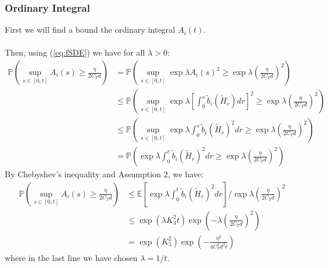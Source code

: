 \documentclass[]{article}
\theoremstyle{definition}
\theoremstyle{assumption}
\theoremstyle{remark}
\begin{document}
\subsubsection{Ordinary Integral}
First we will find a bound the ordinary integral $A_i(t)$. \\ \\
Then, using (\ref{eq:fSDE}) we have for all $\lambda > 0$:
\begin{align*}
\mathbb{P}\left(\sup_{s \in [0, t]}  A_i(s)  \geq \frac{\eta}{2 C_T d} \right) &= \mathbb{P}\left(\sup_{s \in [0, t]}  \exp \lambda A_i(s)^2  \geq \exp \lambda \left(\frac{\eta}{2 C_T d}\right)^2 \right) \\
&\leq \mathbb{P}\left(\sup_{s \in [0, t]}  \exp \lambda \left[ \int_0^s \tilde{b}_i(\tilde{H}_r) dr\right]^2  \geq \exp \lambda \left(\frac{\eta}{2 C_T d}\right)^2 \right) \\
&\leq \mathbb{P}\left(\sup_{s \in [0, t]}  \exp \lambda  \int_0^s \tilde{b}_i(\tilde{H}_r)^2 dr  \geq \exp \lambda \left(\frac{\eta}{2 C_T d}\right)^2 \right) \\
&= \mathbb{P}\left( \exp \lambda  \int_0^t \tilde{b}_i(\tilde{H}_r)^2 dr  \geq \exp \lambda \left(\frac{\eta}{2 C_T d}\right)^2 \right)
\end{align*}
By Chebyshev's inequality and Assumption 2, we have:
\begin{align*}
\mathbb{P}\left(\sup_{s \in [0, t]}  A_i(s)  \geq \frac{\eta}{2 C_T d} \right) &\leq \mathbb{E}\left[ \exp \lambda  \int_0^t \tilde{b}_i(\tilde{H}_r)^2 dr \right] / \exp \lambda \left(\frac{\eta}{2 C_T d}\right)^2 \\
&\leq \exp \left( \lambda K_3^2t \right) \exp \left( -\lambda \left( \frac{\eta}{2 C_T d} \right)^2 \right)\\
&= \exp \left( K_3^2\right) \exp \left( - \frac{\eta^2}{4 C_T^2 d^2 t} \right)
\end{align*}
where in the last line we have chosen $\lambda = 1/t$.
\end{document}
